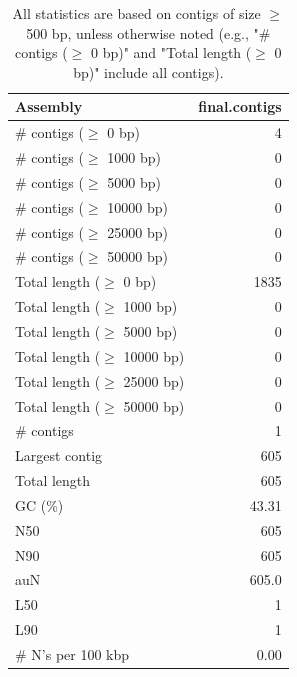 \documentclass[12pt,a4paper]{article}
\begin{document}
\begin{table}[ht]
\begin{center}
\caption{All statistics are based on contigs of size $\geq$ 500 bp, unless otherwise noted (e.g., "\# contigs ($\geq$ 0 bp)" and "Total length ($\geq$ 0 bp)" include all contigs).}
\begin{tabular}{|l*{1}{|r}|}
\hline
Assembly & final.contigs \\ \hline
\# contigs ($\geq$ 0 bp) & 4 \\ \hline
\# contigs ($\geq$ 1000 bp) & 0 \\ \hline
\# contigs ($\geq$ 5000 bp) & 0 \\ \hline
\# contigs ($\geq$ 10000 bp) & 0 \\ \hline
\# contigs ($\geq$ 25000 bp) & 0 \\ \hline
\# contigs ($\geq$ 50000 bp) & 0 \\ \hline
Total length ($\geq$ 0 bp) & 1835 \\ \hline
Total length ($\geq$ 1000 bp) & 0 \\ \hline
Total length ($\geq$ 5000 bp) & 0 \\ \hline
Total length ($\geq$ 10000 bp) & 0 \\ \hline
Total length ($\geq$ 25000 bp) & 0 \\ \hline
Total length ($\geq$ 50000 bp) & 0 \\ \hline
\# contigs & 1 \\ \hline
Largest contig & 605 \\ \hline
Total length & 605 \\ \hline
GC (\%) & 43.31 \\ \hline
N50 & 605 \\ \hline
N90 & 605 \\ \hline
auN & 605.0 \\ \hline
L50 & 1 \\ \hline
L90 & 1 \\ \hline
\# N's per 100 kbp & 0.00 \\ \hline
\end{tabular}
\end{center}
\end{table}
\end{document}
